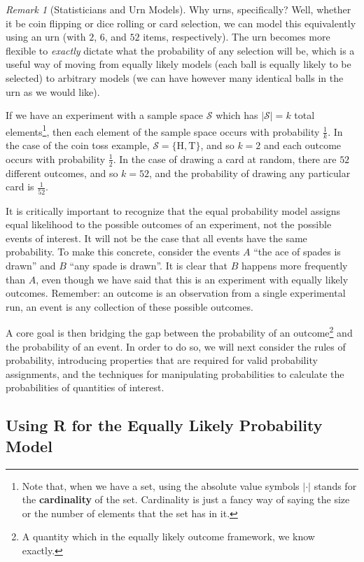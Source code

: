 \documentclass[
  letterpaper,
  DIV=11,
  numbers=noendperiod]{scrreprt}
\theoremstyle{definition}
\theoremstyle{definition}
\theoremstyle{definition}
\theoremstyle{remark}
\newtheorem*{remark}{Remark}
\begin{document}
\begin{remark}[Statisticians and Urn Models]
Why urns, specifically? Well, whether it be coin flipping or dice
rolling or card selection, we can model this equivalently using an urn
(with \(2\), \(6\), and \(52\) items, respectively). The urn becomes
more flexible to \emph{exactly} dictate what the probability of any
selection will be, which is a useful way of moving from equally likely
models (each ball is equally likely to be selected) to arbitrary models
(we can have however many identical balls in the urn as we would like).
\end{remark}

If we have an experiment with a sample space \(\mathcal{S}\) which has
\(|\mathcal{S}| = k\) total elements\footnote{Note that, when we have a
  set, using the absolute value symbols \(|\cdot|\) stands for the
  \textbf{cardinality} of the set. Cardinality is just a fancy way of
  saying the size or the number of elements that the set has in it.},
then each element of the sample space occurs with probability
\(\frac{1}{k}\). In the case of the coin toss example,
\(\mathcal{S} = \{\text{H}, \text{T}\}\), and so \(k=2\) and each
outcome occurs with probability \(\frac{1}{2}\). In the case of drawing
a card at random, there are \(52\) different outcomes, and so \(k=52\),
and the probability of drawing any particular card is \(\frac{1}{52}\).

It is critically important to recognize that the equal probability model
assigns equal likelihood to the possible outcomes of an experiment, not
the possible events of interest. It will not be the case that all events
have the same probability. To make this concrete, consider the events
\(A\) ``the ace of spades is drawn'' and \(B\) ``any spade is drawn''.
It is clear that \(B\) happens more frequently than \(A\), even though
we have said that this is an experiment with equally likely outcomes.
Remember: an outcome is an observation from a single experimental run,
an event is any collection of these possible outcomes.

A core goal is then bridging the gap between the probability of an
outcome\footnote{A quantity which in the equally likely outcome
  framework, we know exactly.} and the probability of an event. In order
to do so, we will next consider the rules of probability, introducing
properties that are required for valid probability assignments, and the
techniques for manipulating probabilities to calculate the probabilities
of quantities of interest.

\subsection{Using R for the Equally Likely Probability
Model}\label{using-r-for-the-equally-likely-probability-model}
\end{document}
